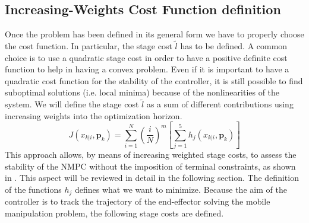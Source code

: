 \subsection{Increasing-Weights Cost Function definition}

Once the problem has been defined in its general form we have to properly choose the cost function. In particular, the stage cost $\tilde{l}$ has to be defined. A common choice is to use a quadratic stage cost in order to have a positive definite cost function to help in having a convex problem. Even if it is important to have a quadratic cost function for the stability of the controller, it is still possible to find suboptimal solutions (i.e. local minima) because of the nonlinearities of the system. We will define the stage cost $\tilde{l}$ as a sum of different contributions using increasing weights into the optimization horizon. 
\begin{equation}
J({x}_{k|i},\textbf{p}_k)=\sum_{i=1}^{N}\left(\frac{i}{N}\right)^m \left[ \sum_{j=1}^{5} h_j({x}_{k|i},\textbf{p}_k) \right]
\end{equation} 
This approach allows, by means of increasing weighted stage costs, to assess the stability of the NMPC without the imposition of terminal constraints, as shown in \cite{alamir2018stability}. This aspect will be reviewed in detail in the following section.
The definition of the functions $h_j$ defines what we want to minimize. Because the aim of the controller is to track the trajectory of the end-effector solving the mobile manipulation problem, the following stage costs are defined.
